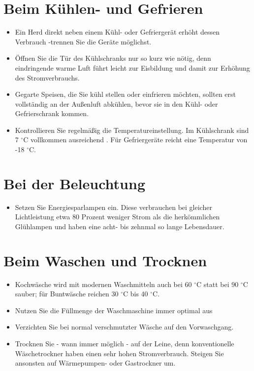 \documentclass{scrartcl}
\begin{document}
\section*{Beim Kühlen- und Gefrieren}
\begin{itemize}
\item
Ein Herd direkt neben einem Kühl- oder Gefriergerät erhöht dessen Verbrauch -trennen Sie die Geräte möglichst.
\item
Öffnen Sie die Tür des Kühlschranks nur so kurz wie nötig, denn eindringende warme Luft führt leicht zur Eisbildung und damit zur Erhöhung des Stromverbrauchs.
\item
Gegarte Speisen, die Sie kühl stellen oder einfrieren möchten, sollten erst vollständig an der Außenluft abkühlen, bevor sie in den Kühl- oder Gefrierschrank kommen.
\item
Kontrollieren Sie regelmäßig die Temperatureinstellung. Im Kühlschrank sind 7 $^{\circ}$C vollkommen ausreichend \cite{schlumberger2006}. Für Gefriergeräte reicht eine Temperatur von -18 $^{\circ}$C.
\end{itemize}

\section*{Bei der Beleuchtung}
\begin{itemize}
\item Setzen Sie Energiesparlampen ein. Diese verbrauchen bei gleicher Lichtleistung etwa 80 Prozent weniger Strom als die herkömmlichen Glühlampen und haben eine acht- bis zehnmal so lange Lebensdauer.
\end{itemize}

\section*{Beim Waschen  und Trocknen}
\begin{itemize}
\item Kochwäsche wird mit modernen Waschmitteln auch bei 60 $^{\circ}$C statt bei 90 $^{\circ}$C
sauber; für Buntwäsche reichen 30 $^{\circ}$C bis 40 $^{\circ}$C.
\item Nutzen Sie die Füllmenge der Waschmaschine immer optimal aus
\item Verzichten Sie bei normal verschmutzter Wäsche auf den Vorwaschgang.
\item Trocknen Sie - wann immer möglich - auf der Leine, denn konventionelle Wäschetrockner haben einen sehr hohen Stromverbrauch. Steigen Sie ansonsten auf Wärmepumpen- oder Gastrockner um.
\end{itemize}
\end{document}
